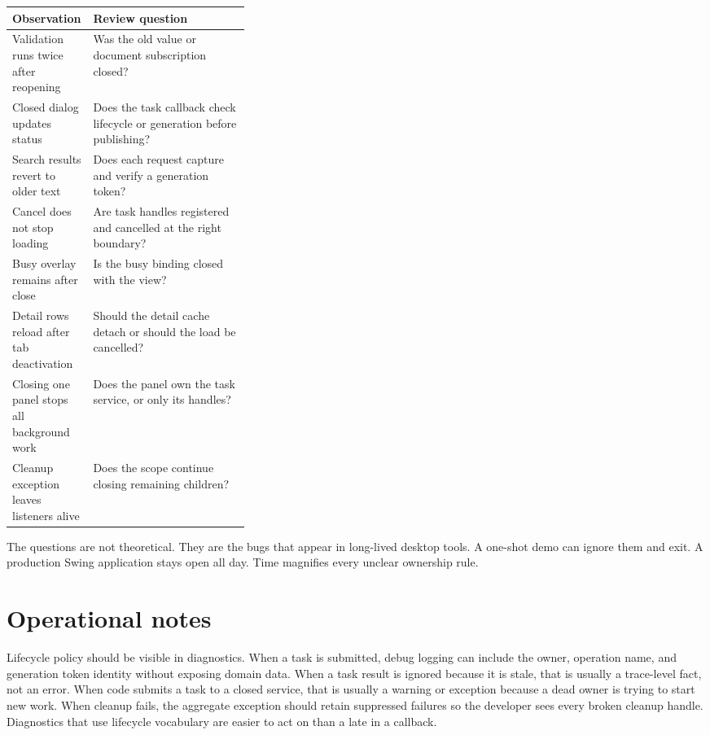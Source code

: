 \noindent\begin{tabularx}{\linewidth}{@{}p{0.34\linewidth}X@{}}
\toprule
Observation & Review question\\
\midrule
Validation runs twice after reopening & Was the old value or document subscription closed?\\
Closed dialog updates status & Does the task callback check lifecycle or generation before publishing?\\
Search results revert to older text & Does each request capture and verify a generation token?\\
Cancel does not stop loading & Are task handles registered and cancelled at the right boundary?\\
Busy overlay remains after close & Is the busy binding closed with the view?\\
Detail rows reload after tab deactivation & Should the detail cache detach or should the load be cancelled?\\
Closing one panel stops all background work & Does the panel own the task service, or only its handles?\\
Cleanup exception leaves listeners alive & Does the scope continue closing remaining children?\\
\bottomrule
\end{tabularx}

The questions are not theoretical. They are the bugs that appear in long-lived
desktop tools. A one-shot demo can ignore them and exit. A production Swing
application stays open all day. Time magnifies every unclear ownership rule.

\section{Operational notes}

Lifecycle policy should be visible in diagnostics. When a task is submitted,
debug logging can include the owner, operation name, and generation token
identity without exposing domain data. When a task result is ignored because it
is stale, that is usually a trace-level fact, not an error. When code submits a
task to a closed service, that is usually a warning or exception because a dead
owner is trying to start new work. When cleanup fails, the aggregate exception
should retain suppressed failures so the developer sees every broken cleanup
handle. Diagnostics that use lifecycle vocabulary are easier to act on than a
late  in a callback.

